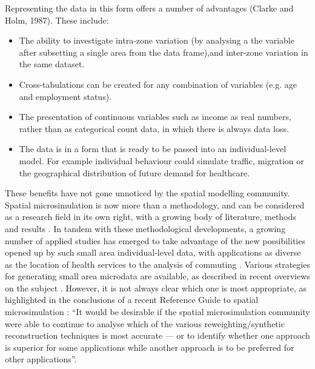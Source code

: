 \documentclass[a4paper,10pt]{article}
\begin{document}
Representing the data in this form offers a number of advantages (Clarke and Holm, 1987). These include:
\begin{itemize}
 \item The ability to investigate intra-zone variation (by analysing a the variable after subsetting 
a single area from the data frame),and inter-zone variation in the same dataset.
\item Cross-tabulations can be created for any combination of variables (e.g. age and employment status).
\item The presentation of continuous variables such as income as real numbers, 
rather than as categorical count data, in which there is always data loss.
\item The data is in a form that is ready to be passed into an individual-level model.
For example individual behaviour could simulate traffic, migration or the geographical distribution of future demand for healthcare.
\end{itemize}


These benefits have not gone unnoticed by the spatial modelling community.
Spatial microsimulation is now more than a methodology, and
can be considered as a research field in its
own right, with a growing body of literature, methods and results \citep{Tanton2013}.
In tandem with these methodological developments, a growing number of applied studies
has emerged to take advantage of the new possibilities opened up by such small area individual-level data,
with applications as diverse as the location of health services \citep{Tomintz2008} to the
analysis of commuting \citep{Lovelace2014-jtg}.
Various strategies for generating small area microdata are available,
as described in recent overviews on the subject \citep{Tanton2013, Ballas2013-4policy-analysis, Hermes2012a}.
However, it is not always clear which one is most appropriate,
as highlighted in the conclusions of a recent Reference Guide to spatial microsimulation
\citep[p~270]{Clarke2013-concs}:
``It would be desirable if the spatial microsimulation community were able to continue to
analyse which of the various reweighting/synthetic reconstruction techniques is most accurate
--- or to identify whether one approach is superior for some applications while another
approach is to be preferred for other applications''.
\end{document}
